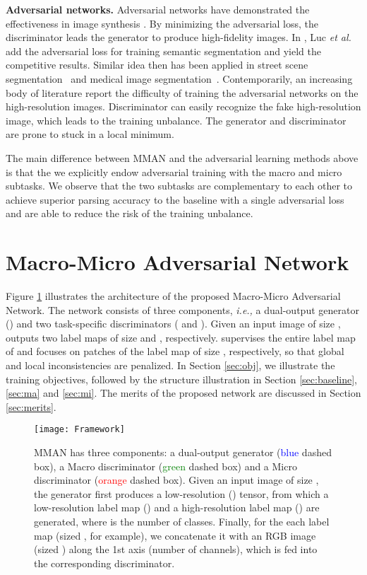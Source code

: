 \documentclass[runningheads]{llncs}
\begin{document}
\textbf{Adversarial networks.}
Adversarial networks have demonstrated the effectiveness in image synthesis \cite{isola2017image,odena2016conditional,reed2016learning,zhong2018camera,zhong2018generalizing}. By minimizing the adversarial loss, the discriminator leads the generator to produce high-fidelity images. In \cite{luc2016semantic}, Luc \emph{et al.} add the adversarial loss for training semantic segmentation and yield the competitive results. Similar idea then has been applied in street scene segmentation~\cite{hung2018adversarial} and medical image segmentation~\cite{dai2017scan,moeskops2017adversarial}.
Contemporarily, an increasing body of literature \cite{denton2015pyramid,karras2017progressive} report the difficulty of training the adversarial networks on the high-resolution images. Discriminator can easily recognize the fake high-resolution image, which leads to the training unbalance. The generator and discriminator are prone to stuck in a local minimum.


The main difference between MMAN and the adversarial learning methods above is that the we explicitly endow adversarial training with the macro and micro subtasks. We observe that the two subtasks are complementary to each other to achieve superior parsing accuracy to the baseline with a single adversarial loss and are able to reduce the risk of the training unbalance.

\section{Macro-Micro Adversarial Network}
Figure \ref{fig:Framework} illustrates the architecture of the proposed Macro-Micro Adversarial Network. The network consists of three components, \emph{i.e.,} a dual-output generator () and two task-specific discriminators ( and ). Given an input image of size ,  outputs two label maps of size  and , respectively.  supervises the entire label map of  and  focuses on patches of the label map of size , respectively, so that global and local inconsistencies are penalized. In Section \ref{sec:obj}, we illustrate the training objectives, followed by the structure illustration in Section \ref{sec:baseline}, \ref{sec:ma} and \ref{sec:mi}. The merits of the proposed network are discussed in Section \ref{sec:merits}.

\begin{figure}[t]
\centering
\texttt{[image: Framework]}
\caption{MMAN has three components: a dual-output generator (\textcolor{blue}{blue} dashed box), a Macro discriminator (\textcolor{green}{green} dashed box) and a Micro discriminator (\textcolor{red}{orange} dashed box). Given an input image of size , the generator  first produces a low-resolution () tensor, from which a low-resolution label map () and a high-resolution label map () are generated, where  is the number of classes.
Finally, for the each label map (sized , for example), we concatenate it with an RGB image (sized ) along the 1st axis (number of channels), which is fed into the corresponding discriminator.}
\label{fig:Framework}
\end{figure}
\end{document}
